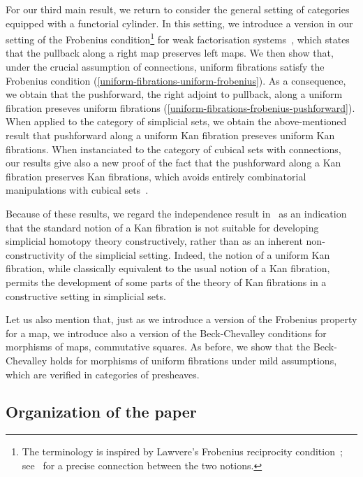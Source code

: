 \documentclass[reqno,10pt,a4paper,oneside,draft]{amsart}
\begin{document}
For our third main result, we return to consider the general setting of categories equipped with a functorial cylinder.
In this setting, we introduce a version in our setting of the Frobenius condition\footnote{The terminology is inspired by Lawvere's Frobenius reciprocity condition~\cite{lawvere-equality}; see~\cite{clementino:frobenius} for a precise connection between the two notions.} for weak factorisation systems~\cite{garner:types-omega-groupoids}, which states that the pullback along a right map preserves left maps.
We then show that, under the crucial assumption of connections, uniform fibrations satisfy the Frobenius condition (\cref{uniform-fibrations-uniform-frobenius}). As a consequence, we obtain that the pushforward, \ie the right adjoint to pullback, along a uniform fibration preseves uniform fibrations (\cref{uniform-fibrations-frobenius-pushforward}). When applied to the category of simplicial sets, we obtain the above-mentioned
result  that pushforward along a uniform Kan fibration preseves uniform Kan fibrations. When instanciated to the category of cubical sets with connections, our results give also a new proof of the fact that the pushforward along a Kan fibration preserves Kan fibrations, which avoids entirely combinatorial manipulations with cubical sets~\cite{coquand-variation}.

Because of these results, we regard the independence result in~\cite{coquand-non-constructivity-kan} as an indication that the standard notion of a Kan fibration is not suitable for developing simplicial homotopy theory constructively, rather than as an inherent non-constructivity of the simplicial setting. Indeed, the notion of a uniform Kan fibration, while classically equivalent to the usual notion of a Kan fibration, permits the development of some parts of the theory of Kan fibrations in a constructive setting in simplicial sets. 

Let us also mention that, just as we introduce a version of the Frobenius property for a map, we introduce also a version of the Beck-Chevalley conditions for morphisms of maps, \ie commutative squares.
As before, we show that the Beck-Chevalley holds for morphisms of uniform fibrations under mild assumptions, which are verified in categories of presheaves.

\subsection*{Organization of the paper}
\end{document}
